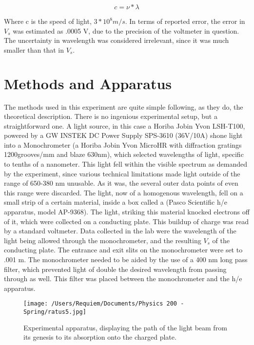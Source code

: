 \documentclass[aps,pre,twocolumn,nofootinbib]{revtex4}
\begin{document}
\begin{equation}
\label{freqwl}
c=\nu*\lambda
\end{equation}

Where c is the speed of light, $3*10^8 m/s$.  In terms of reported error, the error in $V_s$ was estimated as .0005 V, due to the precision of the voltmeter in question.  The uncertainty in wavelength was considered irrelevant, since it was much smaller than that in $V_s$.  

\section{Methods and Apparatus}

The methods used in this experiment are quite simple following, as they do, the theoretical description.  There is no ingenious experimental setup, but a straightforward one.  A light source, in this case a Horiba Jobin Yvon LSH-T100, powered by a GW INSTEK DC Power Supply SPS-3610 (36V/10A) shone light into a Monochrometer (a Horiba Jobin Yvon MicroHR with diffraction gratings 1200grooves/mm and blaze 630nm), which selected wavelengths of light, specific to tenths of a nanometer.  This light fell within the visible spectrum as demanded by the experiment, since various technical limitations made light outside of the range of 650-380 nm unusable.  As it was, the several outer data points of even this range were discarded.  The light, now of a homogenous wavelength, fell on a small strip of a certain material, inside a box called a (Pasco Scientific h/e apparatus, model AP-9368).  The light, striking this material knocked electrons off of it, which were collected on a conducting plate.  This buildup of charge was read by a standard voltmeter.  Data collected in the lab were the wavelength of the light being allowed through the monochrometer, and the resulting $V_s$ of the conducting plate.  The entrance and exit slits on the monochrometer were set to .001 m.  The monochrometer needed to be aided by the use of a 400 nm long pass filter, which prevented light of double the desired wavelength from passing through as well.  This filter was placed between the monochrometer and the h/e apparatus.  

\begin{figure}[h]
\centering
\texttt{[image: /Users/Requiem/Documents/Physics 200 - Spring/ratus5.jpg]} 
\caption{Experimental apparatus, displaying the path of the light beam from its genesis to its absorption onto the charged plate.}
\label{ratus}
\end{figure}
\end{document}
